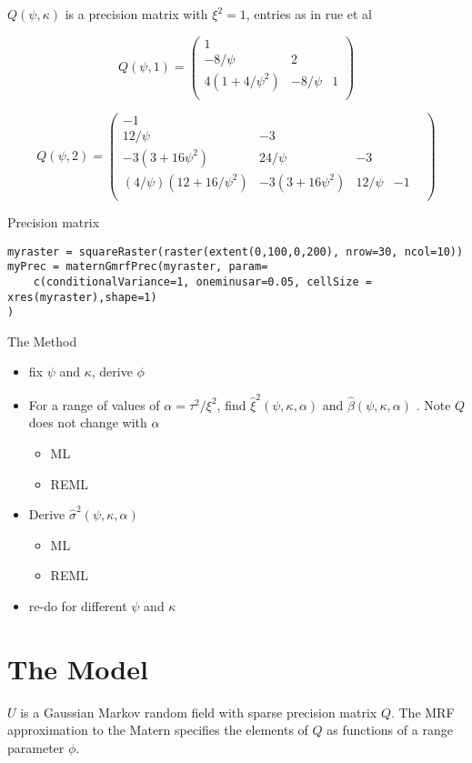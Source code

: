 \documentclass[12pt]{article}
\begin{document}
$Q(\psi,\kappa)$ is a precision matrix with $\xi^2=1$, entries as in rue et al

\[
Q(\psi, 1) = 
\begin{pmatrix}
1 & &  \\
-8/\psi & 2 & \\
4(1+4/\psi^2) & -8/\psi & 1 \\
\end{pmatrix}
\]

\[
Q(\psi, 2) = 
\begin{pmatrix}
-1 & & & \\
12/\psi & -3 & &\\
-3(3+16\psi^2) & 24/\psi & -3& \\
(4/\psi)(12+16/\psi^2) &-3(3+16\psi^2) & 12/\psi & -1& \\
\end{pmatrix}
\]


Precision matrix 
\begin{verbatim}
myraster = squareRaster(raster(extent(0,100,0,200), nrow=30, ncol=10))
myPrec = maternGmrfPrec(myraster, param=
	c(conditionalVariance=1, oneminusar=0.05, cellSize = xres(myraster),shape=1)
)

\end{verbatim}



The Method
\begin{itemize}
  \item fix $\psi$ and $\kappa$, derive  $\phi$
  \item For a range of values of $\alpha = \tau^2/\xi^2$, find 
  $\hat\xi^2(\psi, \kappa, \alpha)$ and  $\hat\beta(\psi, \kappa, \alpha)$ . 
  Note $Q$ does not change with $\alpha$
  \begin{itemize}
    \item ML
    \item REML
    \end{itemize}
	\item Derive $\hat\sigma^2(\psi, \kappa, \alpha)$
  \begin{itemize}
    \item ML
    \item REML
    \end{itemize}
	\item re-do for different $\psi$ and $\kappa$
\end{itemize}


\section*{The Model}
$U$ is a Gaussian Markov random field with sparse precision matrix $Q$.  The MRF
approximation to the Matern specifies the elements of $Q$ as functions of a
range parameter $\phi$.  
\end{document}
